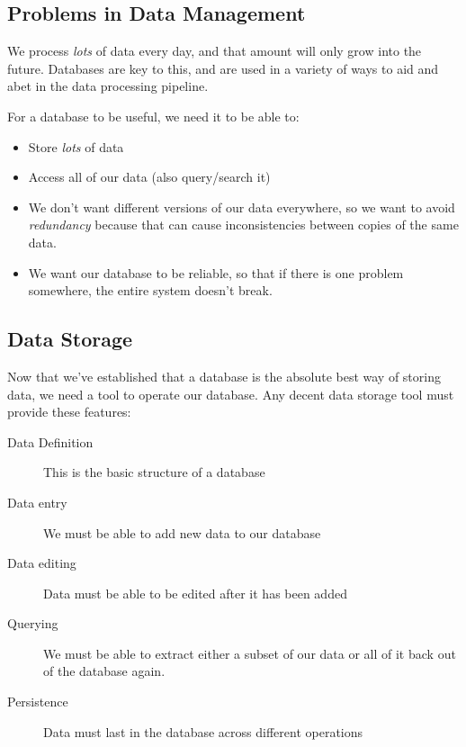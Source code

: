 \subsection{Problems in Data Management}\label{sub:problems_in_data_management}

We process \emph{lots} of data every day, and that amount will only grow into the future.
Databases are key to this, and are used in a variety of ways to aid and abet in the data processing pipeline.

For a database to be useful, we need it to be able to:
\begin{itemize}
    \item Store \emph{lots} of data
    \item Access all of our data (also query/search it)
        \item We don't want different versions of our data everywhere, so we want to avoid \emph{redundancy} because that can cause inconsistencies between copies of the same data.
            \item We want our database to be reliable, so that if there is one problem somewhere, the entire system doesn't break.
\end{itemize}

\subsection{Data Storage}\label{sub:data_storage}

Now that we've established that a database is the absolute best way of storing data, we need a tool to operate our database.
Any decent data storage tool must provide these features:
\begin{description}
    \item[Data Definition] This is the basic structure of a database
        \item[Data entry] We must be able to add new data to our database
            \item[Data editing] Data must be able to be edited after it has been added
                \item[Querying] We must be able to extract either a subset of our data or all of it back out of the database again.
                    \item[Persistence] Data must last in the database across different operations
\end{description}

